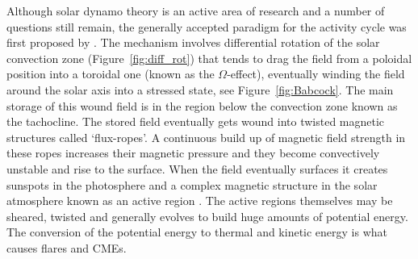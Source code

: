 

Although solar dynamo theory is an active area of research and a number of questions still remain, the generally accepted paradigm for the activity cycle was first proposed by \citet{babcock1961}. The mechanism involves differential rotation of the solar convection zone (Figure~\ref{fig:diff_rot}) that tends to drag the field from a poloidal position into a toroidal one (known as the $\Omega$-effect), eventually winding the field around the solar axis into a stressed state, see Figure~\ref{fig:Babcock}. The main storage of this wound field is in the region below the convection zone known as the tachocline.
The stored field eventually gets wound into twisted magnetic structures called `flux-ropes'. A continuous build up of magnetic field strength in these ropes increases their magnetic pressure and they become convectively unstable and rise to the surface. When the field eventually surfaces it creates sunspots in the photosphere and a complex magnetic structure in the solar atmosphere known as an active region \citep{fan2009}. The active regions themselves may be sheared, twisted and generally evolves to build huge amounts of potential energy. The conversion of the potential energy to thermal and kinetic energy is what causes flares and CMEs.

